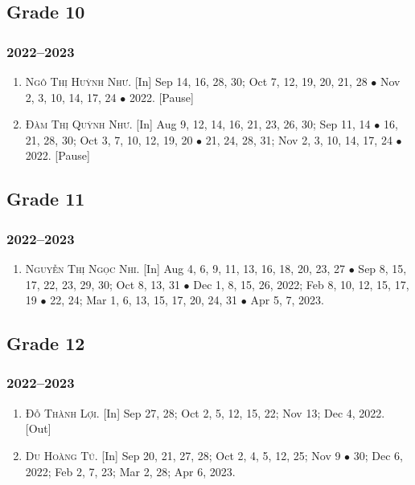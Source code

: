 \documentclass{article}
\begin{document}
\subsection{Grade 10}

\subsubsection{2022--2023}

\begin{enumerate}
	\item \textsc{Ngô Thị Huỳnh Như.} \textsf{[In]} Sep 14, 16, 28, 30; Oct 7, 12, 19, 20, 21, 28 $\bullet$ Nov 2, 3, 10, 14, 17, 24 $\bullet$ 2022. \textsf{[Pause]}
	\item \textsc{Đàm Thị Quỳnh Như.} \textsf{[In]} Aug 9, 12, 14, 16, 21, 23, 26, 30; Sep 11, 14 $\bullet$ 16, 21, 28, 30; Oct 3, 7, 10, 12, 19, 20 $\bullet$ 21, 24, 28, 31; Nov 2, 3, 10, 14, 17, 24 $\bullet$ 2022. \textsf{[Pause]}
\end{enumerate}

\subsection{Grade 11}

\subsubsection{2022--2023}

\begin{enumerate}
	\item \textsc{Nguyễn Thị Ngọc Nhi.} \textsf{[In]} Aug 4, 6, 9, 11, 13, 16, 18, 20, 23, 27 $\bullet$ Sep 8, 15, 17, 22, 23, 29, 30; Oct 8, 13, 31 $\bullet$ Dec 1, 8,  15, 26, 2022; Feb 8, 10, 12, 15, 17, 19 $\bullet$ 22, 24; Mar 1, 6, 13, 15, 17, 20, 24, 31 $\bullet$ Apr 5, 7, 2023.
\end{enumerate}

\subsection{Grade 12}

\subsubsection{2022--2023}

\begin{enumerate}
	\item \textsc{Đỗ Thành Lợi.} \textsf{[In]} Sep 27, 28; Oct 2, 5, 12, 15, 22; Nov 13; Dec 4, 2022. \textsf{[Out]}
	\item \textsc{Du Hoàng Tú.} \textsf{[In]} Sep 20, 21, 27, 28; Oct 2, 4, 5, 12, 25; Nov 9 $\bullet$ 30; Dec 6, 2022; Feb 2, 7, 23; Mar 2, 28; Apr 6, 2023.
\end{enumerate}
\end{document}
